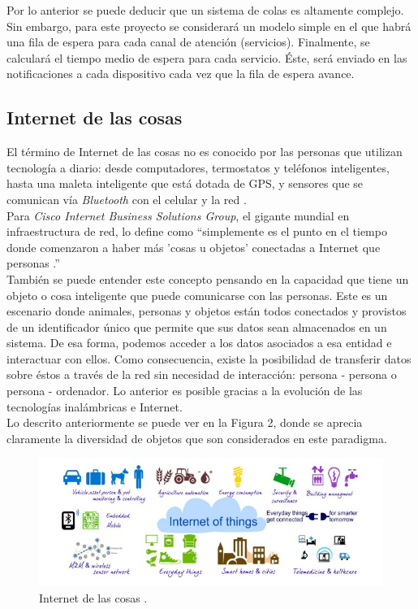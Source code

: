 Por lo anterior se puede deducir que un sistema de colas es altamente complejo. Sin embargo, para este proyecto se considerará un modelo simple en el que habrá una fila de espera para cada canal de atención (servicios). Finalmente, se calculará el tiempo medio de espera para cada servicio. Éste, será enviado en las notificaciones a cada dispositivo cada vez que la fila de espera avance.\\


\subsection{Internet de las cosas}

El término de Internet de las cosas no es conocido por las personas que utilizan tecnología a diario: desde computadores, termostatos y teléfonos inteligentes, hasta una maleta inteligente que está dotada de GPS, y sensores que se comunican vía \textit{Bluetooth} con el celular y la red \cite{Inf14}.\\ 

Para \textit{Cisco Internet Business Solutions Group}, el gigante mundial en infraestructura de red, lo define como ``simplemente es el punto en el tiempo donde comenzaron a haber más 'cosas u objetos' conectadas a Internet que personas \cite{Cis11}.''\\

También se puede entender este concepto pensando en la capacidad que tiene un objeto o cosa inteligente que puede comunicarse con las personas. Este es un escenario donde animales, personas y objetos están todos conectados y provistos de un identificador único que permite que sus datos sean almacenados en un sistema. De esa forma, podemos acceder a los datos asociados a esa entidad e interactuar con ellos. Como consecuencia, existe la posibilidad de transferir datos sobre éstos a través de la red sin necesidad de interacción: persona - persona o persona - ordenador. Lo anterior es posible gracias a la evolución de las tecnologías inalámbricas e Internet.\\

Lo descrito anteriormente se puede ver en la Figura 2, donde se aprecia claramente la diversidad de objetos que son considerados en este paradigma.

\begin{figure}[H]
\centering
\includegraphics[scale=0.70]{images/capitulo2/lOT.jpg}
\caption{Internet de las cosas \cite{The14}.}
\label{IoT}
\end{figure}


